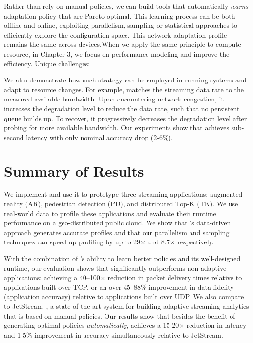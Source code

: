 \documentclass[thesis.tex]{subfiles}
\begin{document}
 Rather than rely on manual policies, we
can build tools that automatically \emph{learns} adaptation policy that are
Pareto optimal. This learning process can be both offline and online, exploiting
parallelism, sampling or statistical approaches to efficiently explore the
configuration space. This network-adaptation profile remains the same across
devices.When we apply the same principle to compute resource, in Chapter 3, we
focus on performance modeling and improve the efficiency. Unique challenges:

We also demonstrate how such strategy can be employed in running systems and
adapt to resource changes. For example, \sysname{} matches the streaming data
rate to the measured available bandwidth. Upon encountering network congestion,
it increases the degradation level to reduce the data rate, such that no
persistent queue builds up. To recover, it progressively decreases the
degradation level after probing for more available bandwidth. Our experiments
show that \sysname{} achieves sub-second latency with only nominal accuracy drop
(2-6\%).

\section{Summary of Results}
\label{sec:summary-results-1}

We implement \awstream{} and use it to prototype three streaming applications:
augmented reality (AR), pedestrian detection (PD), and distributed Top-K
(TK). We use real-world data to profile these applications and evaluate their
runtime performance on a geo-distributed public cloud.  We show that
\awstream{}'s data-driven approach generates accurate profiles and that our
parallelism and sampling techniques can speed up profiling by up to 29$\times$
and 8.7$\times$ respectively.

With the combination of \awstream{}'s ability to learn better policies and its
well-designed runtime, our evaluation shows that \awstream{} significantly
outperforms non-adaptive applications: achieving a 40--100$\times$ reduction in
packet delivery times relative to applications built over TCP, or an over
45--88\% improvement in data fidelity (application accuracy) relative to
applications built over UDP. We also compare \awstream{} to
JetStream~\cite{rabkin2014aggregation}, a state-of-the-art system for building
adaptive streaming analytics that is based on manual policies. Our results show
that besides the benefit of generating optimal policies \textit{automatically},
\awstream{} achieves a 15-20$\times$ reduction in latency and 1-5\% improvement
in accuracy simultaneously relative to JetStream.
\end{document}
